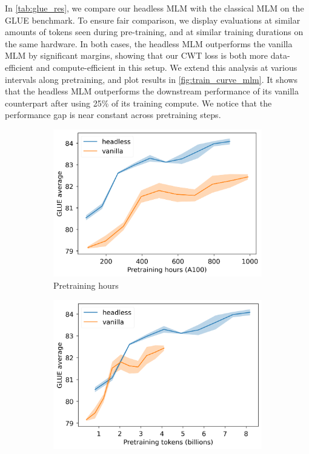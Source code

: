 In \autoref{tab:glue_res}, we compare our headless MLM with the classical MLM on the GLUE benchmark. To ensure fair comparison, we display evaluations at similar amounts of tokens seen during pre-training, and at similar training durations on the same hardware. In both cases, the headless MLM outperforms the vanilla MLM by significant margins, showing that our CWT loss is both more data-efficient and compute-efficient in this setup.
%
We extend this analysis at various intervals along pretraining, and plot results in \autoref{fig:train_curve_mlm}. It shows that the headless MLM outperforms the downstream performance of its vanilla counterpart after using 25\% of its training compute. We notice that the performance gap is near constant across pretraining steps.

\begin{figure}
    \centering
    \begin{subfigure}[b]{0.41\columnwidth}
         \includegraphics[width=\linewidth]{sources/part_2/headless/imgs/bert_compare_hours_p13.png}
         \caption{Pretraining hours}
         \label{fig:bert_compare_hours}
    \end{subfigure}
    \begin{subfigure}[b]{0.40\columnwidth}
         \includegraphics[width=\linewidth]{sources/part_2/headless/imgs/bert_compare_tokens_p13.png}

\end{subfigure}
\end{figure}
